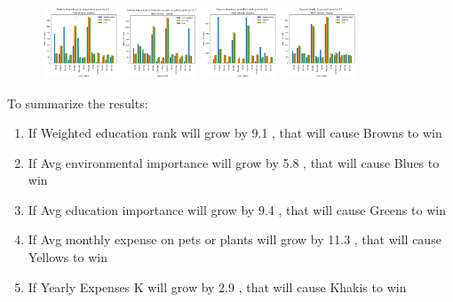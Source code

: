 \documentclass[12pt]{article}
\begin{document}
\begin{figure}[ht]
	\centering
	\includegraphics[width=0.2\textwidth]{dramatic_feature/Avg_education_importance_increased}
	\includegraphics[width=0.2\textwidth]{dramatic_feature/Avg_monthly_expense_on_pets_or_plants_increased}
	\includegraphics[width=0.2\textwidth]{dramatic_feature/Weighted_education_rank_increased}	
	\includegraphics[width=0.2\textwidth]{dramatic_feature/Yearly_ExpensesK_increased}					
\end{figure}

To summarize the results:

\begin{enumerate}

\item If Weighted education rank  will grow by  9.1 , that will cause  Browns  to win

\item If  Avg environmental importance  will grow by  5.8 , that will cause  Blues  to win

\item If  Avg education importance  will grow by  9.4 , that will cause  Greens  to win

\item If  Avg monthly expense on pets or plants will grow by  11.3 , that will cause  Yellows  to win

\item If  Yearly Expenses K  will grow by  2.9 , that will cause  Khakis  to win

\end{enumerate}
\end{document}
